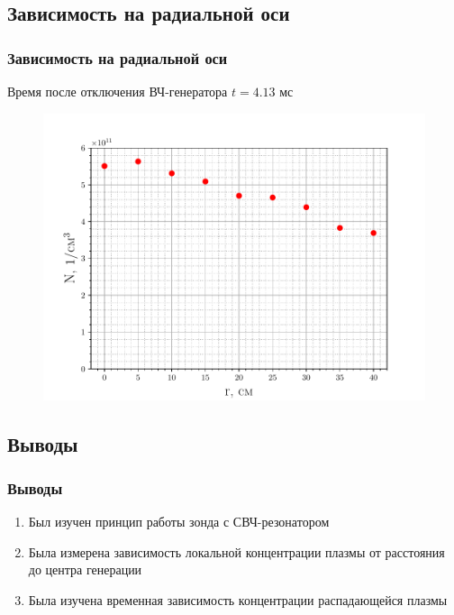 \documentclass[10pt,pdf,hyperref={unicode}, dvipsnames]{beamer}
\begin{document}
\subsection{Зависимость на радиальной оси}
\begin{frame}
	\frametitle{Зависимость на радиальной оси}
	Время после отключения ВЧ-генератора $t=4.13$ мс
	\begin{figure}[tb]
		\centering
		\includegraphics[width=0.9\linewidth]{fig/radial}
		\label{fig:2}
	\end{figure}
\end{frame}

\subsection{Выводы}
\begin{frame}
		\vfill
		\frametitle{Выводы}
		\begin{enumerate}
			\item Был изучен принцип работы зонда с СВЧ-резонатором
			

			\item Была измерена зависимость локальной концентрации плазмы от расстояния до центра генерации
			\item Была изучена временная зависимость концентрации распадающейся плазмы
		\end{enumerate}
		\vfill
\end{frame}
\end{document}
